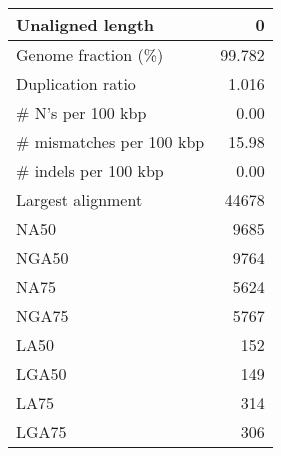 \documentclass[12pt,a4paper]{article}
\begin{document}
\begin{table}[ht]
\begin{center}
\begin{tabular}{|l*{1}{|r}|}
Unaligned length & 0 \\ \hline
Genome fraction (\%) & 99.782 \\ \hline
Duplication ratio & 1.016 \\ \hline
\# N's per 100 kbp & 0.00 \\ \hline
\# mismatches per 100 kbp & 15.98 \\ \hline
\# indels per 100 kbp & 0.00 \\ \hline
Largest alignment & 44678 \\ \hline
NA50 & 9685 \\ \hline
NGA50 & 9764 \\ \hline
NA75 & 5624 \\ \hline
NGA75 & 5767 \\ \hline
LA50 & 152 \\ \hline
LGA50 & 149 \\ \hline
LA75 & 314 \\ \hline
LGA75 & 306 \\ \hline
\end{tabular}
\end{center}
\end{table}
\end{document}
